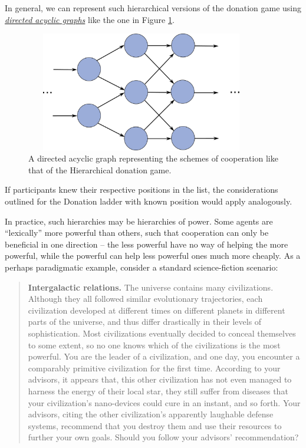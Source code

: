 In general, we can represent such hierarchical versions of the donation
game using
\href{https://en.wikipedia.org/wiki/Directed_acyclic_graph}{\emph{directed
acyclic graphs}} like the one in Figure \ref{donation-DAG}.

\begin{figure}[h!]
    \centering
    \includegraphics[width=3.98958in,height=2.05728in]{figs/donation-DAG}
    \caption{A directed acyclic graph representing the schemes of cooperation like that of the
    Hierarchical donation game.}
    \label{donation-DAG}
\end{figure}

If participants knew their respective positions in the list, the
considerations outlined for the Donation ladder with known position
would apply analogously.

In practice, such hierarchies may be hierarchies of power. Some agents
are ``lexically'' more powerful than others, such that cooperation can
only be beneficial in one direction -- the less powerful have no way of
helping the more powerful, while the powerful can help less powerful
ones much more cheaply. As a perhaps paradigmatic example, consider a
standard science-fiction scenario:

\begin{quote}
\textbf{Intergalactic relations.} The universe contains many
civilizations. Although they all followed similar evolutionary
trajectories, each civilization developed at different times on
different planets in different parts of the universe, and thus differ
drastically in their levels of sophistication. Most civilizations
eventually decided to conceal themselves to some extent, so no one knows
which of the civilizations is the most powerful. You are the leader of a
civilization, and one day, you encounter a comparably primitive
civilization for the first time. According to your advisors, it appears
that, this other civilization has not even managed to harness the energy
of their local star, they still suffer from diseases that your
civilization's nano-devices could cure in an instant, and so forth. Your
advisors, citing the other civilization's apparently laughable defense
systems, recommend that you destroy them and use their resources to
further your own goals. Should you follow your advisors' recommendation?
\end{quote}

